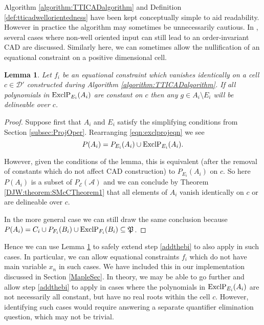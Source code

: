 \documentclass{article}
\newtheorem{lemma}[theorem]{Lemma}
\begin{document}
Algorithm \ref{algorithm:TTICADalgorithm} and Definition \ref{def:tticadwellorientedness} have been kept conceptually simple to aid readability. However in practice the algorithm may sometimes be unnecessarily cautious.  
In \cite{Brown2005}, several cases where non-well oriented input can still lead to an order-invariant CAD are discussed. Similarly here, we can sometimes allow the nullification of an equational constraint on a positive dimensional cell.

\begin{lemma}\label{lemma:constpolys}
Let $f_i$ be an equational constraint which vanishes identically on a cell $c \in \mathcal{D}'$ constructed during Algorithm \ref{algorithm:TTICADalgorithm}. If all polynomials in ${\rm ExclP}_{E_i}(A_i)$ are constant on $c$ then any $g \in A_i \setminus E_i$ will be delineable over $c$. 
\end{lemma}

\begin{proof}
Suppose first that $A_i$ and $E_i$ satisfy the simplifying conditions from Section \ref{subsec:ProjOper}. Rearranging \eqref{eqn:exclprojeqn} we see
  \begin{equation*}
    P(A_i) = P_{E_i}(A_i) \cup {\rm ExclP}_{E_i}(A_i).
  \end{equation*}

However, given the conditions of the lemma, this is equivalent (after the removal of constants which do not affect CAD construction) to $P_{E_i}(A_i)$ on $c$.  So here $P(A_i)$ is a subset of $P_{\mathcal{E}}(\mathcal{A})$ and we can conclude by Theorem \ref{DJW:theorem:SMcCTheorem1} that all elements of $A_i$ vanish identically on $c$ or are delineable over $c$. 

In the more general case we can still draw the same conclusion because $P(A_i) = C_i \cup P_{F_i}(B_i) \cup {\rm ExclP}_{F_i}(B_i) \subseteq \mathfrak{P}$.
\end{proof}

Hence we can use Lemma \ref{lemma:constpolys} to safely extend step \ref{addthebi} to also apply in such cases. In particular, we can allow equational constraints $f_i$ which do not have main variable $x_n$ in such cases. We have included this in our implementation discussed in Section \ref{MapleSec}.
In  theory, we may be able to go further and allow step \ref{addthebi} to apply in cases where the polynomials in ${\rm ExclP}_{E_i}(A_i)$ are not necessarily all constant, but have no real roots within the cell $c$. However, identifying such cases would require answering a separate quantifier elimination question, which may not be trivial. 
\end{document}
